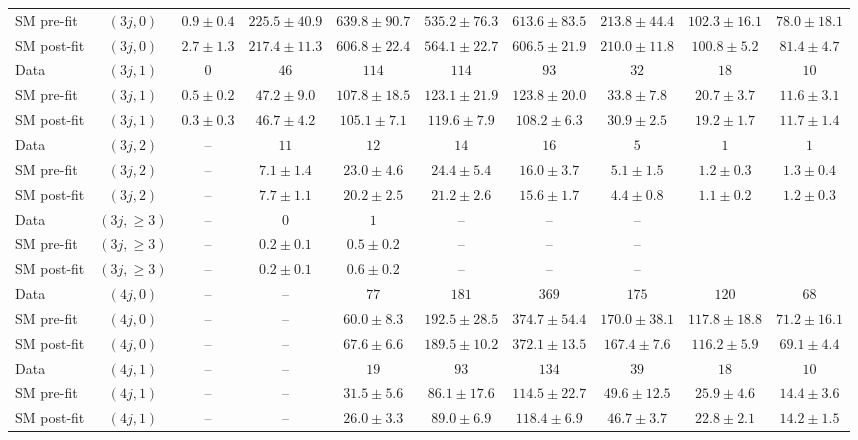 {\begin{table}[h!]
{\begin{tabular}{lccccccccc}
 SM pre-fit & $(3j,0)$ & $0.9\pm0.4$ & $225.5\pm40.9$ & $639.8\pm90.7$ & $535.2\pm76.3$ & $613.6\pm83.5$ & $213.8\pm44.4$ & $102.3\pm16.1$ & $78.0\pm18.1$ \\[0.5ex]
 SM post-fit & $(3j,0)$ & $2.7\pm1.3$ & $217.4\pm11.3$ & $606.8\pm22.4$ & $564.1\pm22.7$ & $606.5\pm21.9$ & $210.0\pm11.8$ & $100.8\pm5.2$ & $81.4\pm4.7$ \\[0.5ex]
 Data & $(3j,1)$ & $0$ & $46$ & $114$ & $114$ & $93$ & $32$ & $18$ & $10$ \\[0.5ex]
 SM pre-fit & $(3j,1)$ & $0.5\pm0.2$ & $47.2\pm9.0$ & $107.8\pm18.5$ & $123.1\pm21.9$ & $123.8\pm20.0$ & $33.8\pm7.8$ & $20.7\pm3.7$ & $11.6\pm3.1$ \\[0.5ex]
 SM post-fit & $(3j,1)$ & $0.3\pm0.3$ & $46.7\pm4.2$ & $105.1\pm7.1$ & $119.6\pm7.9$ & $108.2\pm6.3$ & $30.9\pm2.5$ & $19.2\pm1.7$ & $11.7\pm1.4$ \\[0.5ex]
 Data & $(3j,2)$ & -- & $11$ & $12$ & $14$ & $16$ & $5$ & $1$ & $1$ \\[0.5ex]
 SM pre-fit & $(3j,2)$ & -- & $7.1\pm1.4$ & $23.0\pm4.6$ & $24.4\pm5.4$ & $16.0\pm3.7$ & $5.1\pm1.5$ & $1.2\pm0.3$ & $1.3\pm0.4$ \\[0.5ex]
 SM post-fit & $(3j,2)$ & -- & $7.7\pm1.1$ & $20.2\pm2.5$ & $21.2\pm2.6$ & $15.6\pm1.7$ & $4.4\pm0.8$ & $1.1\pm0.2$ & $1.2\pm0.3$ \\[0.5ex]
 Data & $(3j,\geq 3)$ & -- & $0$ & $1$ & -- & -- & -- \\[0.5ex]
 SM pre-fit & $(3j,\geq 3)$ & -- & $0.2\pm0.1$ & $0.5\pm0.2$ & -- & -- & -- \\[0.5ex]
 SM post-fit & $(3j,\geq 3)$ & -- & $0.2\pm0.1$ & $0.6\pm0.2$ & -- & -- & -- \\[0.5ex]
 Data & $(4j,0)$ & -- & -- & $77$ & $181$ & $369$ & $175$ & $120$ & $68$ \\[0.5ex]
 SM pre-fit & $(4j,0)$ & -- & -- & $60.0\pm8.3$ & $192.5\pm28.5$ & $374.7\pm54.4$ & $170.0\pm38.1$ & $117.8\pm18.8$ & $71.2\pm16.1$ \\[0.5ex]
 SM post-fit & $(4j,0)$ & -- & -- & $67.6\pm6.6$ & $189.5\pm10.2$ & $372.1\pm13.5$ & $167.4\pm7.6$ & $116.2\pm5.9$ & $69.1\pm4.4$ \\[0.5ex]
 Data & $(4j,1)$ & -- & -- & $19$ & $93$ & $134$ & $39$ & $18$ & $10$ \\[0.5ex]
 SM pre-fit & $(4j,1)$ & -- & -- & $31.5\pm5.6$ & $86.1\pm17.6$ & $114.5\pm22.7$ & $49.6\pm12.5$ & $25.9\pm4.6$ & $14.4\pm3.6$ \\[0.5ex]
 SM post-fit & $(4j,1)$ & -- & -- & $26.0\pm3.3$ & $89.0\pm6.9$ & $118.4\pm6.9$ & $46.7\pm3.7$ & $22.8\pm2.1$ & $14.2\pm1.5$ \\[0.5ex]

\end{tabular}}
\end{table}}
